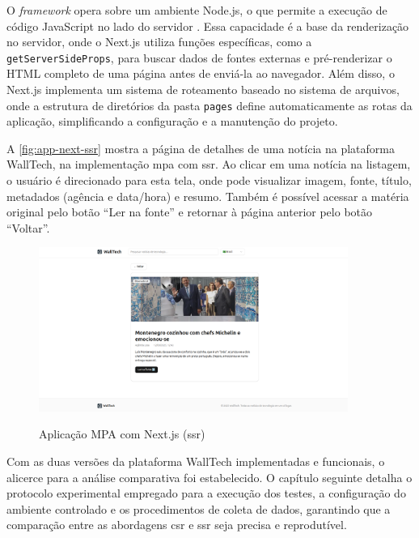 O \emph{framework} opera sobre um ambiente Node.js, o que permite a execução de código JavaScript no lado do servidor \cite{nodejs2025}. Essa capacidade é a base da renderização no servidor, onde o Next.js utiliza funções específicas, como a \texttt{getServerSideProps}, para buscar dados de fontes externas e pré-renderizar o HTML completo de uma página antes de enviá-la ao navegador. Além disso, o Next.js implementa um sistema de roteamento baseado no sistema de arquivos, onde a estrutura de diretórios da pasta \texttt{pages} define automaticamente as rotas da aplicação, simplificando a configuração e a manutenção do projeto.


A \autoref{fig:app-next-ssr} mostra a página de detalhes de uma notícia na plataforma WallTech, na implementação \acrshort{mpa} com \acrshort{ssr}. Ao clicar em uma notícia na listagem, o usuário é direcionado para esta tela, onde pode visualizar imagem, fonte, título, metadados (agência e data/hora) e resumo. Também é possível acessar a matéria original pelo botão “Ler na fonte” e retornar à página anterior pelo botão “Voltar”.

\begin{figure}[H]
  \centering
  \caption{Aplicação MPA com Next.js (\acrshort{ssr})}
  \includegraphics[width=0.9\textwidth]{media/app_next_ssr.png}
  \label{fig:app-next-ssr}
\end{figure}



\vspace{1cm}
Com as duas versões da plataforma WallTech implementadas e funcionais, o alicerce para a análise comparativa foi estabelecido. O capítulo seguinte detalha o protocolo experimental empregado para a execução dos testes, a configuração do ambiente controlado e os procedimentos de coleta de dados, garantindo que a comparação entre as abordagens \acrshort{csr} e \acrshort{ssr} seja precisa e reprodutível.



